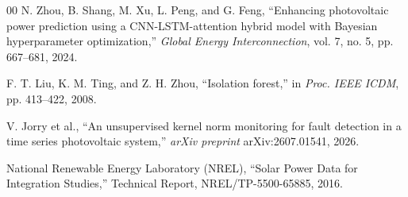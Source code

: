 \documentclass[conference]{IEEEtran}
\begin{document}
\begin{thebibliography}{00}
 N. Zhou, B. Shang, M. Xu, L. Peng, and G. Feng, ``Enhancing photovoltaic power prediction using a CNN-LSTM-attention hybrid model with Bayesian hyperparameter optimization,'' \textit{Global Energy Interconnection}, vol. 7, no. 5, pp. 667--681, 2024.

 F. T. Liu, K. M. Ting, and Z. H. Zhou, ``Isolation forest,'' in \textit{Proc. IEEE ICDM}, pp. 413--422, 2008.

 V. Jorry et al., ``An unsupervised kernel norm monitoring for fault detection in a time series photovoltaic system,'' \textit{arXiv preprint} arXiv:2607.01541, 2026.

 National Renewable Energy Laboratory (NREL), ``Solar Power Data for Integration Studies,'' Technical Report, NREL/TP-5500-65885, 2016.

\end{thebibliography}
\end{document}

